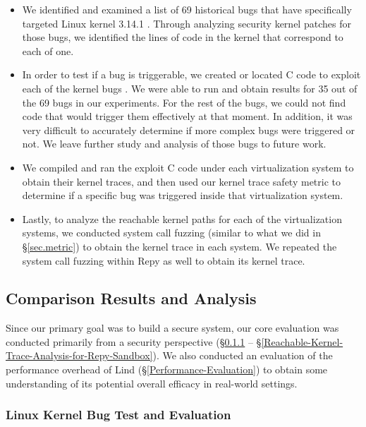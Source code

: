 \begin{itemize}
\item We identified and examined a list of  69 historical bugs that have
specifically 
targeted Linux kernel 3.14.1 \cite{CVE-Datasource}. Through analyzing
security kernel patches for those bugs, 
we identified the lines of code in the kernel that correspond to each of
one.

\item In order to test if a bug is triggerable, we created or located C
code to 
exploit each of the kernel bugs \cite{Exploit-Database}. We were able to
run and obtain results for 
35 out of the 69 bugs in our experiments. For the rest of the bugs, 
we could not find code that would trigger them effectively at that
moment. 
In addition, it was very difficult to accurately determine if more complex
bugs 
were triggered or not. We leave further study and analysis of those bugs to
future work.

\item We compiled and ran the exploit C code under each virtualization
system to 
obtain their kernel traces, and then used our kernel trace safety metric to
determine 
if a specific bug was triggered inside that virtualization system. 

\item Lastly, to  analyze the reachable kernel paths for each of the
virtualization systems, 
we conducted system call fuzzing (similar to what we did in \S{\ref{sec.metric}}) to obtain
the kernel trace in each system. 
We repeated the system call fuzzing within Repy as well to obtain its
kernel trace. 
\end{itemize}

\subsection{Comparison Results and Analysis}

Since our primary goal was to build a secure system, our core evaluation
was conducted primarily 
from a security perspective
(\S{\ref{Linux-Kernel-Bug-Test-and-Evaluation}} --
\S{\ref{Reachable-Kernel-Trace-Analysis-for-Repy-Sandbox}}). 
We also conducted an evaluation of the performance overhead of Lind
(\S{\ref{Performance-Evaluation}}) 
to obtain some understanding of its potential overall efficacy in
real-world settings.

\subsubsection{Linux Kernel Bug Test and Evaluation}
\label{Linux-Kernel-Bug-Test-and-Evaluation}

